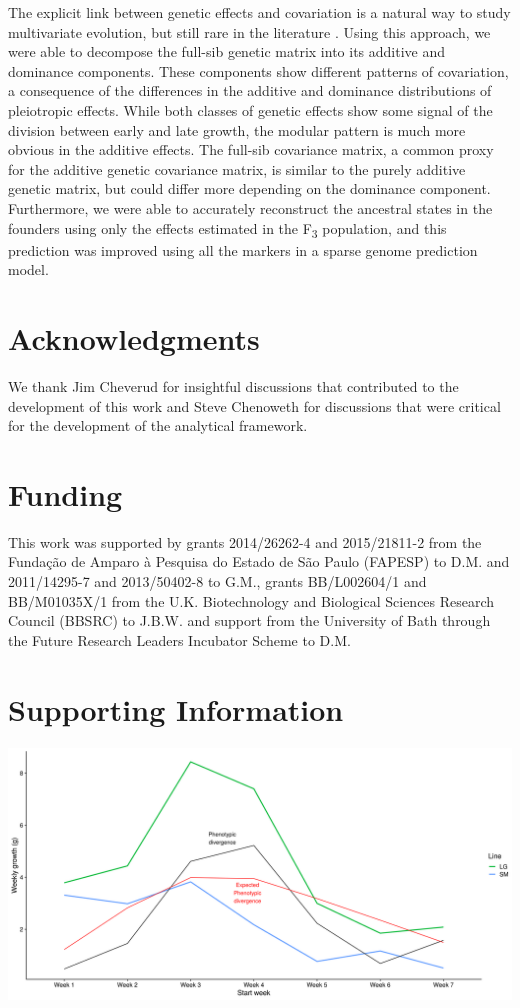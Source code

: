 \begin{refsection}
The explicit link between genetic effects and covariation is a natural
way to study multivariate evolution, but still rare in the literature \parencite{Kelly2009-bj}.
Using this approach, we were able to decompose the full-sib genetic matrix into its
additive and dominance components. These components show different
patterns of covariation, a consequence of the differences in the
additive and dominance distributions of pleiotropic effects. While both
classes of genetic effects show some signal of the division between
early and late growth, the modular pattern is much more obvious in the
additive effects. The full-sib covariance matrix, a common proxy for the
additive genetic covariance matrix, is similar to the purely additive
genetic matrix, but could differ more depending on the dominance
component. Furthermore, we were able to accurately reconstruct the
ancestral states in the founders using only the effects estimated in
the F\textsubscript{3} population, and this prediction was improved using all the
markers in a sparse genome prediction model.


\section{Acknowledgments}
We thank Jim Cheverud for insightful discussions that contributed to the
development of this work and Steve Chenoweth for discussions that were
critical for the development of the analytical framework.


\section{Funding}

This work was supported by grants 2014/26262-4 and 2015/21811-2 from the
Fundação de Amparo à Pesquisa do Estado de São Paulo (FAPESP) to D.M.
and 2011/14295-7 and 2013/50402-8 to G.M., grants BB/L002604/1 and
BB/M01035X/1 from the U.K. Biotechnology and Biological Sciences
Research Council (BBSRC) to J.B.W. and support from the University of
Bath through the Future Research Leaders Incubator Scheme to D.M.

\printbibliography

\newpage

\section{Supporting Information}

\includegraphics[width=\linewidth]{chapter_JoH-Melo_etal/media/growth_LG_SM_DZ2.png}


\end{refsection}
